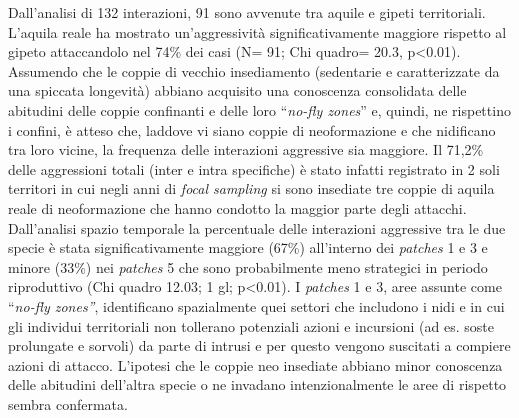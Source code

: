 Dall{\textquoteright}analisi di 132 interazioni, 91 sono avvenute tra
aquile e gipeti territoriali. L{\textquoteright}aquila reale ha
mostrato un{\textquoteright}aggressivit\`a significativamente maggiore
rispetto al gipeto attaccandolo nel 74\% dei casi (N= 91; Chi quadro=
20.3, p{\textless}0.01). Assumendo che le coppie di vecchio
insediamento (sedentarie e caratterizzate da una spiccata longevit\`a)
abbiano acquisito una conoscenza consolidata delle abitudini delle
coppie confinanti e delle loro {\textquotedblleft}\textit{no-fly
zones}{\textquotedblright} e, quindi, ne rispettino i confini, \`e
atteso che, laddove vi siano coppie di neoformazione e che nidificano
tra loro vicine, la frequenza delle interazioni aggressive sia
maggiore. Il 71,2\% delle aggressioni totali (inter e intra specifiche)
\`e stato infatti registrato in 2 soli territori in cui negli anni di
\textit{focal sampling} si sono insediate tre coppie di aquila reale di
neoformazione che hanno condotto la maggior parte degli attacchi.
Dall{\textquoteright}analisi spazio temporale la percentuale delle
interazioni aggressive tra le due specie \`e stata significativamente
maggiore (67\%) all{\textquoteright}interno dei \textit{patches} 1 e 3
e minore (33\%) nei \textit{patches} 5 che sono probabilmente meno
strategici in periodo riproduttivo (Chi quadro 12.03; 1 gl;
p{\textless}0.01). I \textit{patches} 1 e 3, aree assunte come
{\textquotedblleft}\textit{no-fly zones{\textquotedblright}},
identificano spazialmente quei settori che includono i nidi e in cui
gli individui territoriali non tollerano potenziali azioni e incursioni
(ad es. soste prolungate e sorvoli) da parte di intrusi e per questo
vengono suscitati a compiere azioni di attacco.
L{\textquoteright}ipotesi che le coppie neo insediate abbiano minor
conoscenza delle abitudini dell{\textquoteright}altra specie o ne
invadano intenzionalmente le aree di rispetto sembra confermata. 

